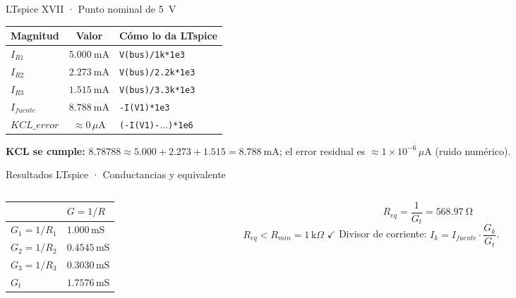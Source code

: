 \documentclass[aspectratio=169]{beamer}
\begin{document}
\begin{frame}{LTspice XVII · Punto nominal de \SI{5}{\volt}}
  \begin{table}
    \small
    \begin{tabular}{lcl}
      \toprule
      Magnitud & Valor & Cómo lo da LTspice \\
      \midrule
      $I_{R1}$ & $\SI{5.000}{\milli\ampere}$ & \texttt{V(bus)/1k*1e3} \\
      $I_{R2}$ & $\SI{2.273}{\milli\ampere}$ & \texttt{V(bus)/2.2k*1e3} \\
      $I_{R3}$ & $\SI{1.515}{\milli\ampere}$ & \texttt{V(bus)/3.3k*1e3} \\
      $I_{fuente}$ & $\SI{8.788}{\milli\ampere}$ & \texttt{-I(V1)*1e3} \\
      \midrule
      $KCL\_error$ & $\approx 0\,\mu\text{A}$ & \texttt{(-I(V1)-$\dots$)*1e6} \\
      \bottomrule
    \end{tabular}
  \end{table}
  \pause
  \textbf{KCL se cumple:} $8.78788 \approx 5.000 + 2.273 + 1.515 = \SI{8.788}{\milli\ampere}$;
  el error residual es $\approx 1\times10^{-6}\,\mu\text{A}$ (ruido numérico).
\end{frame}

\begin{frame}{Resultados LTspice · Conductancias y equivalente}
  \begin{columns}[T]
    \begin{column}{0.5\textwidth}
      \begin{table}
        \small
        \begin{tabular}{ll}
          \toprule
          & $G = 1/R$ \\
          \midrule
          $G_1 = 1/R_1$ & $1.000\,\text{mS}$ \\
          $G_2 = 1/R_2$ & $0.4545\,\text{mS}$ \\
          $G_3 = 1/R_3$ & $0.3030\,\text{mS}$ \\
          $G_t$ & $1.7576\,\text{mS}$ \\
          \bottomrule
        \end{tabular}
      \end{table}
    \end{column}
    \begin{column}{0.5\textwidth}
      \[
        R_{eq} = \frac{1}{G_t} = \SI{568.97}{\ohm}
      \]
      $R_{eq} < R_{min} = 1\,\text{k}\Omega$ $\checkmark$
      \pause
      \small Divisor de corriente:
      $I_k = I_{fuente}\cdot\dfrac{G_k}{G_t}$.
    \end{column}
  \end{columns}
\end{frame}
\end{document}
